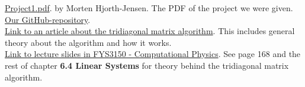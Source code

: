 \documentclass{article}
\begin{document}
\href{https://github.com/CompPhysics/ComputationalPhysics/blob/master/doc/Projects/2019/Project1/pdf/Project1.pdf}{Project1.pdf}. by Morten Hjorth-Jensen. The PDF of the project we were given.\\
\href{https://github.com/Erikbgram/Fys3150}{Our GitHub-repository}. \\

\href{http://www.industrial-maths.com/ms6021_thomas.pdf}{Link to an article about the tridiagonal matrix algorithm}. This includes general theory about the algorithm and how it works. \\

\href{https://github.com/CompPhysics/ComputationalPhysics/blob/master/doc/Lectures/lectures2015.pdf}{Link to lecture slides in FYS3150 - Computational Physics}. See page 168 and the rest of chapter \textbf{6.4 Linear Systems} for theory behind the tridiagonal matrix algorithm.






\end{document}
